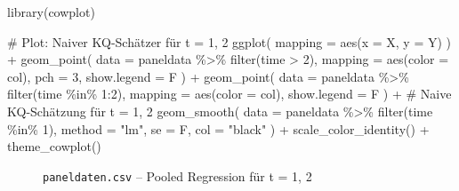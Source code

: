 \documentclass[
  a4paper,
  DIV=11,
  oneside]{scrreprt}
\newenvironment{Shaded}{\begin{snugshade}}{\end{snugshade}}
\newcommand{\AttributeTok}[1]{\textcolor[rgb]{0.40,0.45,0.13}{#1}}
\newcommand{\CommentTok}[1]{\textcolor[rgb]{0.37,0.37,0.37}{#1}}
\newcommand{\DecValTok}[1]{\textcolor[rgb]{0.68,0.00,0.00}{#1}}
\newcommand{\FunctionTok}[1]{\textcolor[rgb]{0.28,0.35,0.67}{#1}}
\newcommand{\NormalTok}[1]{\textcolor[rgb]{0.00,0.23,0.31}{#1}}
\newcommand{\SpecialCharTok}[1]{\textcolor[rgb]{0.37,0.37,0.37}{#1}}
\newcommand{\StringTok}[1]{\textcolor[rgb]{0.13,0.47,0.30}{#1}}
\begin{document}
\begin{Shaded}
\begin{Highlighting}[]
\FunctionTok{library}\NormalTok{(cowplot)}

\CommentTok{\# Plot: Naiver KQ{-}Schätzer für t = 1, 2}
\FunctionTok{ggplot}\NormalTok{(}
  \AttributeTok{mapping =} \FunctionTok{aes}\NormalTok{(}\AttributeTok{x =}\NormalTok{ X, }\AttributeTok{y =}\NormalTok{ Y)}
\NormalTok{) }\SpecialCharTok{+}
  \FunctionTok{geom\_point}\NormalTok{(}
    \AttributeTok{data =}\NormalTok{ paneldata }\SpecialCharTok{\%\textgreater{}\%} 
      \FunctionTok{filter}\NormalTok{(time }\SpecialCharTok{\textgreater{}} \DecValTok{2}\NormalTok{),}
    \AttributeTok{mapping =} \FunctionTok{aes}\NormalTok{(}\AttributeTok{color =}\NormalTok{ col),}
    \AttributeTok{pch =} \DecValTok{3}\NormalTok{,}
    \AttributeTok{show.legend =}\NormalTok{ F}
\NormalTok{  ) }\SpecialCharTok{+}
  \FunctionTok{geom\_point}\NormalTok{(}
    \AttributeTok{data =}\NormalTok{ paneldata }\SpecialCharTok{\%\textgreater{}\%} 
      \FunctionTok{filter}\NormalTok{(time }\SpecialCharTok{\%in\%} \DecValTok{1}\SpecialCharTok{:}\DecValTok{2}\NormalTok{),}
    \AttributeTok{mapping =} \FunctionTok{aes}\NormalTok{(}\AttributeTok{color =}\NormalTok{ col),}
    \AttributeTok{show.legend =}\NormalTok{ F}
\NormalTok{  ) }\SpecialCharTok{+}
  \CommentTok{\# Naive KQ{-}Schätzung für t = 1, 2}
  \FunctionTok{geom\_smooth}\NormalTok{(}
    \AttributeTok{data =}\NormalTok{ paneldata }\SpecialCharTok{\%\textgreater{}\%} 
      \FunctionTok{filter}\NormalTok{(time }\SpecialCharTok{\%in\%} \DecValTok{1}\NormalTok{),}
    \AttributeTok{method =} \StringTok{"lm"}\NormalTok{, }
    \AttributeTok{se =}\NormalTok{ F,}
    \AttributeTok{col =} \StringTok{"black"}
\NormalTok{  ) }\SpecialCharTok{+}
  \FunctionTok{scale\_color\_identity}\NormalTok{() }\SpecialCharTok{+}
  \FunctionTok{theme\_cowplot}\NormalTok{()}
\end{Highlighting}
\end{Shaded}

\begin{figure}[t]


\caption{\label{fig-pooledregression1}\texttt{paneldaten.csv} -- Pooled
Regression für t = 1, 2}

\end{figure}%
\end{document}
